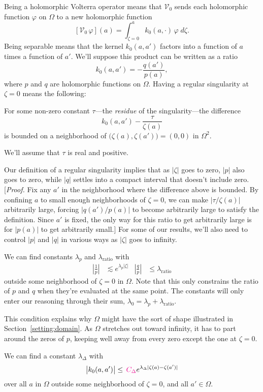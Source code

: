 \documentclass{article}
\makeatletter
\theoremstyle{plain}
\newcommand{\condconst}[2]{\item[($\text{\textsc{#1}} \mid #2$)]\protected@edef\@currentlabel{$\text{\textsc{#1}} \mid #2$}}
\newcommand{\hardpart}{\mathcal{V}_0}
\newcommand{\hardker}{k_0}
\newcommand{\domain}{\Omega}
\newenvironment{verify}{\color{ForestGreen}}{\color{black}}
\makeatother
\begin{document}
Being a holomorphic Volterra operator means that $\hardpart$ sends each holomorphic function $\varphi$ on $\domain$ to a new holomorphic function
\[ [\hardpart\,\varphi](a) = \int_{\zeta = 0}^a \hardker(a, \cdot)\,\varphi\;d\zeta. \]
Being separable means that the kernel $\hardker(a, a')$ factors into a function of $a$ times a function of $a'$. We'll suppose this product can be written as a ratio
\[ \hardker(a, a') = - \frac{q(a')}{p(a)}, \]
where $p$ and $q$ are holomorphic functions on $\domain$. Having a regular singularity at $\zeta = 0$ means the following:
\begin{conditions}
\condconst{sing}{\tau}\label{cond:sing} For some non-zero constant $\tau$---the {\em residue} of the singularity---the difference
\[ \hardker(a, a') - \frac{\tau}{\zeta(a)} \]
is bounded on a neighborhood of $\big(\zeta(a), \zeta(a')\big) = (0, 0)$ in $\domain^2$.
\end{conditions}
We'll assume that $\tau$ is real and positive.

Our definition of a regular singularity implies that as $|\zeta|$ goes to zero, $|p|$ also goes to zero, while $|q|$ settles into a compact interval that doesn't include zero.
\begin{verify}
[\textit{Proof.} Fix any $a'$ in the neighborhood where the difference above is bounded. By confining $a$ to small enough neighborhoods of $\zeta = 0$, we can make $|\tau/\zeta(a)|$ arbitrarily large, forcing $|q(a')/p(a)|$ to become arbitrarily large to satisfy the definition. Since $a'$ is fixed, the only way for this ratio to get arbitrarily large is for $|p(a)|$ to get arbitrarily small.]
\end{verify}
For some of our results, we'll also need to control $|p|$ and $|q|$ in various ways as $|\zeta|$ goes to infinity.
\begin{conditions}
\condconst{slow}{\lambda_0}\label{cond:slow} We can find constants $\lambda_p$ and $\lambda_\text{ratio}$ with
\begin{align*}
\left|\frac{1}{p}\right| & \lesssim e^{\lambda_p |\zeta|} &
\left|\frac{q}{p}\right| & \le \lambda_\text{ratio}
\end{align*}
outside some neighborhood of $\zeta = 0$ in $\Omega$. Note that this only constrains the ratio of $p$ and $q$ when they're evaluated at the same point. The constants will only enter our reasoning through their sum, $\lambda_0 = \lambda_p + \lambda_\text{ratio}$.
\end{conditions}
This condition explains why $\domain$ might have the sort of shape illustrated in Section~\ref{setting:domain}. As $\domain$ stretches out toward infinity, it has to part around the zeros of $p$, keeping well away from every zero except the one at $\zeta = 0$.
\begin{conditions}
\condconst{diag$_0$}{\lambda_\Delta}\label{cond:diag-basic} We can find a constant $\lambda_\Delta$ with
\[ \big| \hardker(a, a') \big| \leq \,  \textcolor{magenta}{C_\Delta} e^{\lambda_\Delta|\zeta(a)-\zeta(a')|} \]
over all $a$ in $\domain$ outside some neighborhood of $\zeta = 0$, and all $a' \in \domain$.
\end{conditions}
\end{document}
